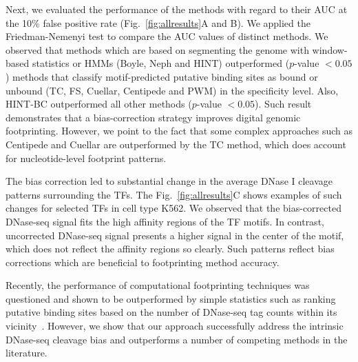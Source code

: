 \documentclass{AbstractTemplate}
\begin{document}
Next, we evaluated the performance of the methods with regard to their AUC at the 10\% false positive rate (Fig.~\ref{fig:allresults}A and B). We applied the Friedman-Nemenyi test to compare the AUC values of distinct methods. We observed that methods which are based on segmenting the genome with window-based statistics or HMMs (Boyle, Neph and HINT) outperformed ($p$-value $< 0.05$) methods that classify motif-predicted putative binding sites as bound or unbound (TC, FS, Cuellar, Centipede and PWM) in the specificity level. Also, HINT-BC outperformed all other methods ($p$-value $< 0.05$). Such result demonstrates that a bias-correction strategy improves digital genomic footprinting. However, we point to the fact that some complex approaches such as Centipede and Cuellar are outperformed by the TC method, which does account for nucleotide-level footprint patterns.

The bias correction led to substantial change in the average DNase I cleavage patterns surrounding the TFs. The Fig.~\ref{fig:allresults}C shows examples of such changes for selected TFs in cell type K562. We observed that the bias-corrected DNase-seq signal fits the high affinity regions of the TF motifs. In contrast, uncorrected DNase-seq signal presents a higher signal in the center of the motif, which does not reflect the affinity regions so clearly. Such patterns reflect bias corrections which are beneficial to footprinting method accuracy.

Recently, the performance of computational footprinting techniques was questioned and shown to be outperformed by simple statistics such as ranking putative binding sites based on the number of DNase-seq tag counts within its vicinity~\cite{he2014}. However, we show that our approach successfully address the intrinsic DNase-seq cleavage bias and outperforms a number of competing methods in the literature.
\end{document}
